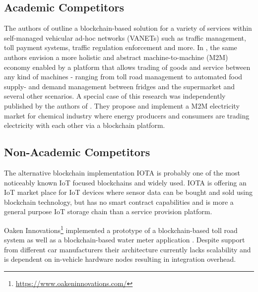 \documentclass{llncs}
\begin{document}
{		%

		\subsection{Academic Competitors}
			\label{sss:academic-competitors}
			
			The authors of \cite{leiding2016self} outline a blockchain-based solution for a variety of services within self-managed vehicular ad-hoc networks (VANETs) such as traffic management, toll payment systems, traffic regulation enforcement and more. In \cite{leidingM2M}, the same authors envision a more holistic and abstract machine-to-machine (M2M) economy enabled by a platform that allows trading of goods and service between any kind of machines - ranging from toll road management to automated food  supply- and demand management between fridges and the supermarket and several other scenarios. A special case of this research was independently published by the authors of \cite{sikorski2017blockchain}. They propose and implement a M2M electricity market for chemical industry where energy producers and consumers are trading electricity with each other via a blockchain platform.

			
		\subsection{Non-Academic Competitors}
			\label{sss:non-academic-competitors}

			The alternative blockchain implementation IOTA \cite{iotaWhitepaper} is probably one of the most noticeably known IoT focused blockchains and widely used. IOTA is offering an IoT market place \cite{iotaMarketplace} for IoT devices where sensor data can be bought and sold using blockchain technology, but has no smart contract capabilities and is more a general purpose IoT storage chain than a service provision platform.
			
			Oaken Innovations\footnote{\url{https://www.oakeninnovations.com/}} implemented a prototype of a blockchain-based toll road system \cite{oakenTeslaTollbooth} as well as a blockchain-based water meter application \cite{oakenWaterMeter}. Despite support from different car manufacturers their architecture currently lacks scalability and is dependent on in-vehicle hardware nodes resulting in integration overhead. 
			
}
\end{document}
